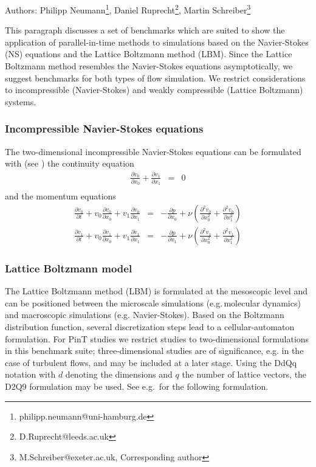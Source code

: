 Authors: Philipp Neumann\footnote{philipp.neumann@uni-hamburg.de}, Daniel Ruprecht\footnote{D.Ruprecht@leeds.ac.uk}, Martin Schreiber\footnote{M.Schreiber@exeter.ac.uk, Corresponding author}

This paragraph discusses a set of benchmarks which are suited to show the application of parallel-in-time methods to simulations based on the Navier-Stokes (NS) equations and the Lattice Boltzmann method (LBM).
Since the Lattice Boltzmann method resembles the Navier-Stokes equations asymptotically, we suggest benchmarks for both types of flow simulation.
We restrict considerations to incompressible (Navier-Stokes) and weakly compressible (Lattice Boltzmann) systems.


\subsubsection{Incompressible Navier-Stokes equations}
The two-dimensional incompressible Navier-Stokes equations can be formulated with (see \cite{wikiTaylorGreen}) the continuity equation
\begin{eqnarray}
\frac{\partial v_0}{\partial x_0}+ \frac{\partial v_1}{\partial x_1} &=& 0\\
\end{eqnarray}
and the momentum equations
\begin{eqnarray}
\frac{\partial v_0}{\partial t} + v_0\frac{\partial v_0}{\partial x_0} + v_1\frac{\partial v_0}{\partial x_1} &=&
-\frac{\partial p}{\partial x_0} + \nu \left( \frac{\partial^2 v_0}{\partial x_0^2} +
\frac{\partial^2 v_0}{\partial x_1^2} \right)\\
%
\frac{\partial v_1}{\partial t} + v_0\frac{\partial v_1}{\partial x_0} + v_1\frac{\partial v_1}{\partial x_1} &=&
-\frac{\partial p}{\partial x_1} + \nu \left( \frac{\partial^2 v_1}{\partial x_0^2} +
\frac{\partial^2 v_1}{\partial x_1^2} \right)
\end{eqnarray}



\subsubsection{Lattice Boltzmann model}
The Lattice Boltzmann method (LBM) is formulated at the mesoscopic level and can be positioned between the microscale simulations (e.g.\,molecular dynamics) and macroscopic simulations (e.g. Navier-Stokes).
Based on the Boltzmann distribution function, several discretization steps lead to a cellular-automaton formulation.
For PinT studies we restrict studies to two-dimensional formulations in this benchmark suite; three-dimensional studies are of significance, e.g. in the case of turbulent flows, and may be included at a later stage.
Using the DdQq notation with $d$ denoting the dimensions and $q$ the number of lattice vectors, the D2Q9 formulation may be used.
See e.g.\,\cite{korner2005lattice} for the following formulation.

